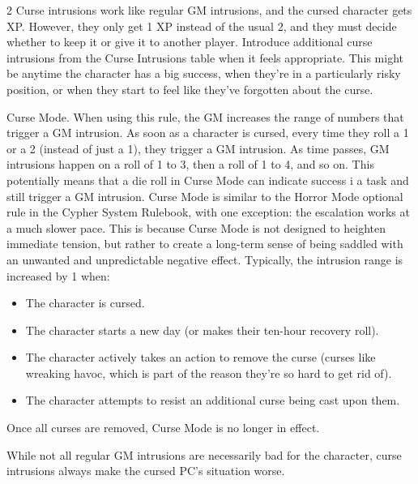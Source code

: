 \begin{multicols}{2}
Curse intrusions work like regular GM intrusions, and the cursed character gets XP. However, they only get 1 XP instead of the usual 2, and they must decide whether to keep it or give it to another player. Introduce additional curse intrusions from the Curse Intrusions table when it feels appropriate. This might be anytime the character has a big success, when they’re in a particularly risky position, or when they start to feel like they’ve forgotten about the curse.

Curse Mode. When using this rule, the GM increases the range of numbers that trigger a GM intrusion. As soon as a character is cursed, every time they roll a 1 or a 2 (instead of just a 1), they trigger a GM intrusion. As time passes, GM intrusions happen on a roll of 1 to 3, then a roll of 1 to 4, and so on. This potentially means that a die roll in Curse Mode can indicate success i a task and still trigger a GM intrusion. Curse Mode is similar to the Horror Mode optional rule in the Cypher System Rulebook, with one exception: the escalation works at a much slower pace. This is because Curse Mode is not designed to heighten immediate tension, but rather to create a long-term sense of being saddled with an unwanted and unpredictable negative effect.
	Typically, the intrusion range is increased by 1 when:
\begin{itemize}
\item The character is cursed.
\item The character starts a new day (or makes their ten-hour recovery roll).
\item The character actively takes an action to remove the curse (curses like wreaking havoc, which is part of the reason they’re so hard to get rid of).
\item The character attempts to resist an additional curse being cast upon them.
\end{itemize}

Once all curses are removed, Curse Mode is no longer in effect.

While not all regular GM intrusions are necessarily bad for the character, curse intrusions always make the cursed PC’s situation worse.

\end{multicols}

